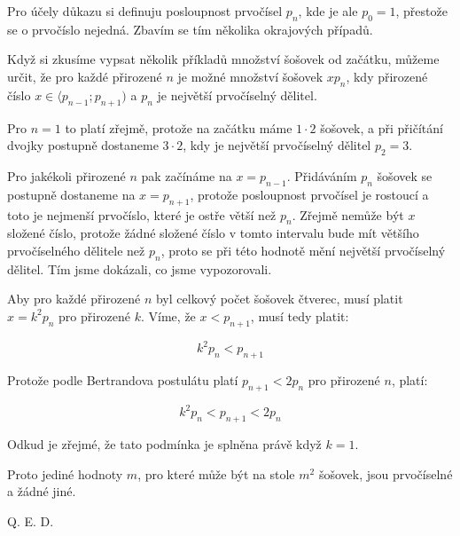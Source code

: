 \documentclass{fkssolpub}
\author{Ondřej Sedláček}
\begin{document}
 

Pro účely důkazu si definuju posloupnost prvočísel $p_n$, kde je ale $p_0 = 1$,
přestože se o prvočíslo nejedná. Zbavím se tím několika okrajových případů.

Když si zkusíme vypsat několik příkladů množství šošovek od začátku, můžeme
určit, že pro každé přirozené $n$ je možné množství šošovek $x p_n$, kdy 
přirozené číslo $x \in \langle p_{n-1}; p_{n+1})$ a $p_n$ je největší prvočíselný
dělitel.

Pro $n = 1$ to platí zřejmě, protože na začátku máme $1 \cdot 2$ šošovek, a při
přičítání dvojky postupně dostaneme $3 \cdot 2$, kdy je největší prvočíselný dělitel
$p_2 = 3$.

Pro jakékoli přirozené $n$ pak začínáme na $x = p_{n - 1}$. Přidáváním $p_n$ šošovek
se postupně dostaneme na $x = p_{n + 1}$, protože posloupnost prvočísel je rostoucí
a toto je nejmenší prvočíslo, které je ostře větší než $p_n$. Zřejmě nemůže být $x$
složené číslo, protože žádné složené číslo v tomto intervalu bude mít většího prvočíselného
dělitele než $p_n$, proto se při této hodnotě mění největší prvočíselný dělitel. Tím
jsme dokázali, co jsme vypozorovali.

Aby pro každé přirozené $n$ byl celkový počet šošovek čtverec, musí platit $x = k^2 p_n$ 
pro přirozené $k$. Víme, že $x < p_{n+1}$, musí tedy platit:

\[
  k^2 p_n < p_{n + 1}
\]

Protože podle Bertrandova postulátu platí $p_{n + 1} < 2p_n$ pro přirozené $n$, platí:

\[
  k^2 p_n < p_{n + 1} < 2p_n
\]

Odkud je zřejmé, že tato podmínka je splněna právě když $k = 1$.

Proto jediné hodnoty $m$, pro které může být na stole $m^2$ šošovek, jsou prvočíselné
a žádné jiné.

Q. E. D.
\end{document}
